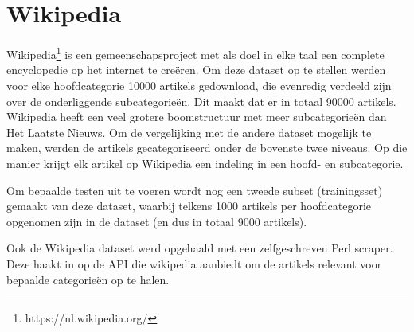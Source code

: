 \section{Wikipedia}
Wikipedia\footnote{https://nl.wikipedia.org/} is een gemeenschapsproject met als doel in elke taal een complete encyclopedie op het internet te cre\"eren. Om deze dataset op te stellen werden voor elke hoofdcategorie 10000 artikels gedownload, die evenredig verdeeld zijn over de onderliggende subcategorie\"en. Dit maakt dat er in totaal 90000 artikels. Wikipedia heeft een veel grotere boomstructuur met meer subcategorie\"en dan Het Laatste Nieuws. Om de vergelijking met de andere dataset mogelijk te maken, werden de artikels  gecategoriseerd onder de bovenste twee niveaus. Op die manier krijgt elk artikel op Wikipedia een indeling in een hoofd- en subcategorie. 

Om bepaalde testen uit te voeren wordt nog een tweede subset (trainingsset) gemaakt van deze dataset, waarbij telkens 1000 artikels per hoofdcategorie opgenomen zijn in de dataset (en dus in totaal 9000 artikels).

Ook de Wikipedia dataset werd opgehaald met een zelfgeschreven Perl scraper. Deze haakt in op de API die wikipedia aanbiedt om de artikels relevant voor bepaalde categorie\"en op te halen. 